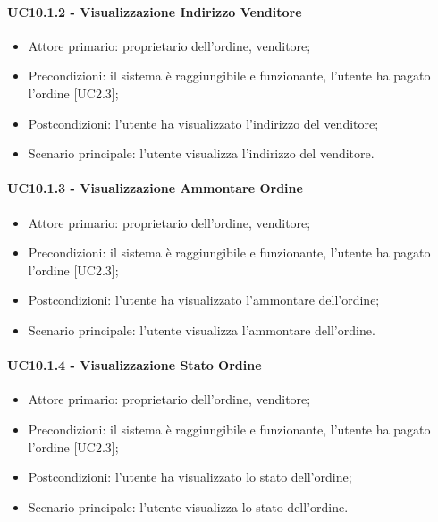 \paragraph{UC10.1.2 - Visualizzazione Indirizzo Venditore}

\begin{itemize}
    \item Attore primario: proprietario dell'ordine, venditore;
    \item Precondizioni: il sistema è raggiungibile e funzionante, l'utente ha pagato l'ordine [UC2.3];
    \item Postcondizioni: l'utente ha visualizzato l'indirizzo del venditore;
    \item Scenario principale: l'utente visualizza l'indirizzo del venditore.
\end{itemize}

\paragraph{UC10.1.3 - Visualizzazione Ammontare Ordine}

\begin{itemize}
    \item Attore primario: proprietario dell'ordine, venditore;
    \item Precondizioni: il sistema è raggiungibile e funzionante, l'utente ha pagato l'ordine [UC2.3];
    \item Postcondizioni: l'utente ha visualizzato l'ammontare dell'ordine;
    \item Scenario principale: l'utente visualizza l'ammontare dell'ordine.
\end{itemize}

\paragraph{UC10.1.4 - Visualizzazione Stato Ordine}

\begin{itemize}
    \item Attore primario: proprietario dell'ordine, venditore;
    \item Precondizioni: il sistema è raggiungibile e funzionante, l'utente ha pagato l'ordine [UC2.3];
    \item Postcondizioni: l'utente ha visualizzato lo stato dell'ordine;
    \item Scenario principale: l'utente visualizza lo stato dell'ordine.
\end{itemize}

